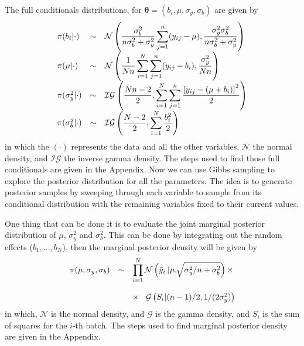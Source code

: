 \documentclass{asaproc}
\begin{document}
The full conditionals distributions, for $\boldsymbol{\theta} = (b_i,\mu, \sigma_y, \sigma_b)$ are given by
\begin{eqnarray*}
\begin{array}{lcl ll }
\pi(b_i|\cdot) & \sim & \mathcal{N}\left( \dfrac{\sigma_b^2}{n\sigma_b^2 + \sigma_y^2} \displaystyle\sum_{j=1}^{n} (y_{ij} - \mu) , \dfrac{\sigma_y^2\sigma_b^2}{n\sigma_b^2 + \sigma_y^2} \right) \\

\pi(\mu|\cdot) & \sim & \mathcal{N}\left( \dfrac{1}{Nn} \displaystyle\sum_{i=1}^{N}\sum_{j=1}^{n} (y_{ij} - b_i) , \dfrac{\sigma_y^2}{Nn} \right) \\

\pi(\sigma_y^2|\cdot) & \sim &  \mathcal{IG} \left( \dfrac{Nn - 2}{2} , \displaystyle\sum_{i=1}^{N}\sum_{j=1}^{n}\frac{\left[ y_{ij} - (\mu + b_i) \right]^2}{2} \right) \\

\pi(\sigma_b^2|\cdot) & \sim &  \mathcal{IG} \left( \dfrac{N-2}{2} , \displaystyle\sum_{i=1}^{N}\dfrac{b_i^2}{2} \right)

\end{array}
\end{eqnarray*}
\noindent
in which the $(\cdot)$ represents the data and all the other variables, $\mathcal{N}$ the normal density, and $\mathcal{IG}$ the inverse gamma density. The steps used to find those full conditionals are given in the Appendix. Now we can use Gibbs sampling to explore the posterior distribution for all the parameters. The idea is to generate posterior samples by sweeping through each variable to sample from its conditional distribution with the remaining variables fixed to their current values.

One thing that can be done it is to evaluate the joint marginal posterior distribution of $\mu$, $\sigma^2_y$ and $\sigma^2_b$. This can be done by integrating out the random effects ($b_1, ..., b_N$), then the marginal posterior density will be given by
\begin{eqnarray*}
\begin{array}{lcl ll }
\pi(\mu, \sigma_y, \sigma_b) & \sim & \displaystyle\prod_{i=1}^{N} \mathcal{N} \left( \bar{y}_{i.} | \mu,  \displaystyle\sqrt[]{\sigma_y^2/n + \sigma_b^2} \right) \times \\\\

 & & \times \hspace{0.3cm} \mathcal{G} \left( S_{i} | (n-1)/2,  1/(2\sigma_y^2) \right) \\

\end{array}
\end{eqnarray*}
\noindent
in which, $\mathcal{N}$ is the normal density, and $\mathcal{G}$ is the gamma density, and $S_i$ is the sum of squares for the $i$-th batch. The steps used to find marginal posterior density are given in the Appendix.
\end{document}
